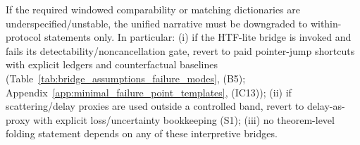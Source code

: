 \begin{remark}
\label{rem:four_way_unification_contract_fallback}
\AuditTag If the required windowed comparability or matching dictionaries are underspecified/unstable, the unified narrative must be downgraded to within-protocol statements only.
In particular:
(i) if the HTF-lite bridge is invoked and fails its detectability/noncancellation gate, revert to paid pointer-jump shortcuts with explicit ledgers and counterfactual baselines
(Table~\ref{tab:bridge_assumptions_failure_modes}, (B5); Appendix~\ref{app:minimal_failure_point_templates}, (IC13));
(ii) if scattering/delay proxies are used outside a controlled band, revert to delay-as-proxy with explicit loss/uncertainty bookkeeping (S1);
(iii) no theorem-level folding statement depends on any of these interpretive bridges.
\end{remark}

